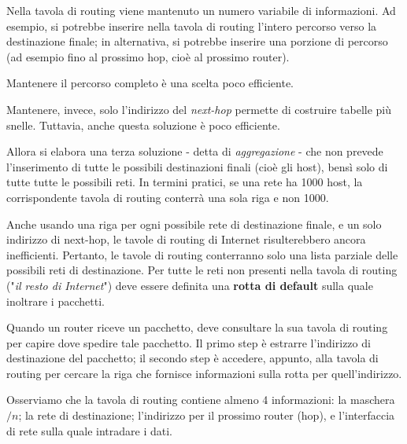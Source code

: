         \vspace{3mm}
        
        Nella tavola di routing viene mantenuto un numero variabile di informazioni. Ad esempio, si potrebbe inserire nella tavola di routing l'intero percorso verso la destinazione finale; in alternativa, si potrebbe inserire una porzione di percorso (ad esempio fino al prossimo hop, cioè al prossimo router).
        
        \vspace{3mm}
        
        Mantenere il percorso completo è una scelta poco efficiente.
        
        Mantenere, invece, solo l'indirizzo del \textit{next-hop} permette di costruire tabelle più snelle. Tuttavia, anche questa soluzione è poco efficiente.
        
        \vspace{3mm}
        
        Allora si elabora una terza soluzione - detta di \textit{aggregazione} - che non prevede l'inserimento di tutte le possibili destinazioni finali (cioè gli host), bensì solo di tutte tutte le possibili reti. In termini pratici, se una rete ha 1000 host, la corrispondente tavola di routing conterrà una sola riga e non 1000.
        
        \vspace{3mm}
        
        Anche usando una riga per ogni possibile rete di destinazione finale, e un solo indirizzo di next-hop, le tavole di routing di Internet risulterebbero ancora inefficienti. Pertanto, le tavole di routing conterranno solo una lista parziale delle possibili reti di destinazione. Per tutte le reti non presenti nella tavola di routing ("\textit{il resto di Internet}") deve essere definita una \textbf{rotta di default} sulla quale inoltrare i pacchetti.
        
        \vspace{3mm}
        
        Quando un router riceve un pacchetto, deve consultare la sua tavola di routing per capire dove spedire tale pacchetto. Il primo step è estrarre l'indirizzo di destinazione del pacchetto; il secondo step è accedere, appunto, alla tavola di routing per cercare la riga che fornisce informazioni sulla rotta per quell'indirizzo.
        
        Osserviamo che la tavola di routing contiene almeno 4 informazioni: la maschera $/n$; la rete di destinazione; l'indirizzo per il prossimo router (hop), e l'interfaccia di rete sulla quale intradare i dati.
        
